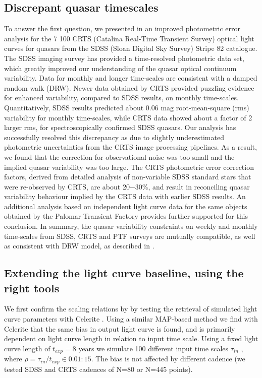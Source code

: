 \documentclass[modern]{aastex62}
\begin{document}
\subsection{Discrepant quasar timescales}
To answer the first question, we presented in \cite{suberlak2017} an improved photometric error analysis for the 7 100 CRTS (Catalina Real-Time Transient Survey) optical light curves for quasars from the SDSS (Sloan Digital Sky Survey) Stripe 82 catalogue. The SDSS imaging survey has provided a time-resolved photometric data set, which greatly improved our understanding of the quasar optical continuum variability. Data for monthly and longer time-scales are consistent with a damped random walk (DRW). Newer data obtained by CRTS provided puzzling evidence for enhanced variability, compared to SDSS results, on monthly time-scales. Quantitatively, SDSS results predicted about 0.06 mag root-mean-square (rms) variability for monthly time-scales, while CRTS data showed about a factor of 2 larger rms, for spectroscopically confirmed SDSS quasars. Our analysis has successfully resolved this discrepancy as due to slightly underestimated photometric uncertainties from the CRTS image processing pipelines. As a result, we found that the correction for observational noise was too small and the implied quasar variability was too large. The CRTS photometric error correction factors, derived from detailed analysis of non-variable SDSS standard stars that were re-observed by CRTS, are about $20 \mathrm{-} 30 \%$, and result in reconciling quasar variability behaviour implied by the CRTS data with earlier SDSS results. An additional analysis based on independent light curve data for the same objects obtained by the Palomar Transient Factory provides further supported for this conclusion. In summary, the quasar variability constraints on weekly and monthly time-scales from SDSS, CRTS and PTF surveys are mutually compatible, as well as consistent with DRW model, as described in \cite{suberlak2017}. 



\subsection{Extending the light curve baseline, using the right tools}
We first confirm the scaling relations by \cite{kozlowski2017a} by testing the retrieval of simulated light curve parameters with Celerite .  Using a similar MAP-based method we find with Celerite that the same bias in output light curve is found, and is primarily dependent on light curve length in relation to input time scale. Using a fixed light curve length of $t_{exp} = 8$ years we simulate 100 different input time scales $\tau_{in}$ ,  where  $\rho = \tau_{in} / t_{exp} \in   { 0.01 : 15}$.  The bias is not affected by different cadence (we tested SDSS and CRTS cadences of N=80 or N=445 points).
\end{document}
